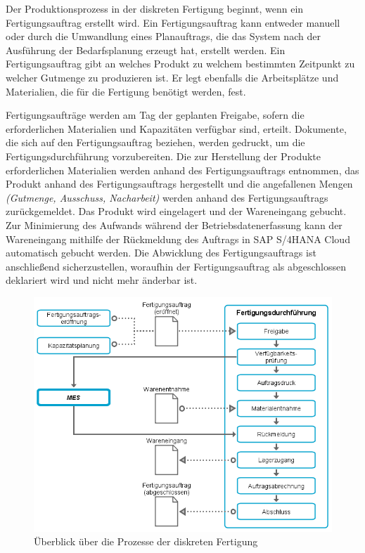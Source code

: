 Der Produktionsprozess in der diskreten Fertigung beginnt, wenn ein Fertigungsauftrag erstellt wird. 
Ein Fertigungsauftrag kann entweder manuell oder durch die Umwandlung eines Planauftrags, die das System nach der Ausführung der Bedarfsplanung erzeugt hat, erstellt werden. 
Ein Fertigungsauftrag gibt an welches Produkt zu welchem bestimmten Zeitpunkt zu welcher Gutmenge zu produzieren ist. 
Er legt ebenfalls die Arbeitsplätze und Materialien, die für die Fertigung benötigt werden, fest. 
\cite{Dickersbach.2014}

Fertigungsaufträge werden am Tag der geplanten Freigabe, sofern die erforderlichen Materialien und Kapazitäten verfügbar sind, erteilt. 
Dokumente, die sich auf den Fertigungsauftrag beziehen, werden gedruckt, um die Fertigungsdurchführung vorzubereiten. 
Die zur Herstellung der Produkte erforderlichen Materialien werden anhand des Fertigungsauftrags entnommen, das Produkt anhand des Fertigungsauftrags hergestellt und die angefallenen Mengen \textit{(Gutmenge, Ausschuss, Nacharbeit)} werden anhand des Fertigungsauftrags zurückgemeldet.
Das Produkt wird eingelagert und der Wareneingang gebucht. 
Zur Minimierung des Aufwands während der Betriebsdatenerfassung kann der Wareneingang mithilfe der Rückmeldung des Auftrags in SAP S/4HANA Cloud automatisch gebucht werden.
Die Abwicklung des Fertigungsauftrags ist anschließend sicherzustellen, woraufhin der Fertigungsauftrag als abgeschlossen deklariert wird und nicht mehr änderbar ist.
\cite{Dickersbach.2014}

\begin{figure}[H]
	\centering 
    \includegraphics[width=\textwidth]{img/fertigungsdurch_ist.png}	
    \caption[Überblick über die Prozesse der diskreten Fertigung]
    {Überblick über die Prozesse der diskreten Fertigung\protect\footnotemark}
    \label{fig:Überblick über die Prozesse der diskreten Fertigung}
\end{figure}

